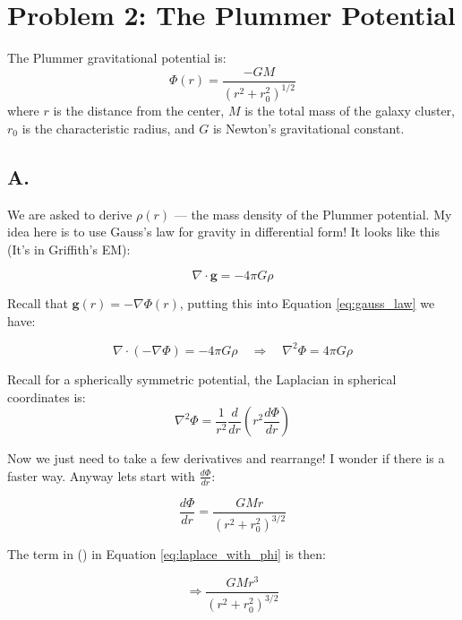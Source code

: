 \section*{Problem 2: The Plummer Potential}

The Plummer gravitational potential is:
\begin{equation}
    \Phi(r) = \frac{-GM}{({r^2 + r_0^2})^{1/2}}
\end{equation}
where \(r\) is the distance from the center, \(M\) is the total mass of the galaxy cluster, \(r_0\) is the characteristic radius, and \(G\) is Newton's gravitational constant.


\subsection*{A.}
We are asked to derive $\rho(r)$ --- the mass density of the Plummer potential.  My idea here is to use Gauss’s law for gravity in differential form! It looks like this (It's in Griffith's EM):

\begin{equation} \label{eq:gauss_law}
\nabla \cdot \mathbf{g} = -4 \pi G \rho
\end{equation}

Recall that $ \mathbf{g}(r) = - \nabla \Phi(r) $, putting this into Equation \ref{eq:gauss_law} we have:

\begin{equation}\label{eq:laplace_with_G}
\nabla \cdot (- \nabla \Phi) = -4 \pi G \rho \quad \Rightarrow \quad \nabla^2 \Phi = 4 \pi G \rho
\end{equation}

Recall for a spherically symmetric potential, the Laplacian in spherical coordinates is:
\begin{equation} \label{eq:laplace_with_phi}
\nabla^2 \Phi = \frac{1}{r^2} \frac{d}{dr} \left( r^2 \frac{d\Phi}{dr} \right)
\end{equation}

Now we just need to take a few derivatives and rearrange! I wonder if there is a faster way. Anyway lets start with $\frac{d\Phi}{dr}$:

\begin{equation}
\frac{d\Phi}{dr} = \frac{GM r}{(r^2 + r_0^2)^{3/2}}
\end{equation}

The term in () in Equation \ref{eq:laplace_with_phi} is then:

\begin{equation}
\Rightarrow \frac{GM r^3}{(r^2 + r_0^2)^{3/2}}
\end{equation}

